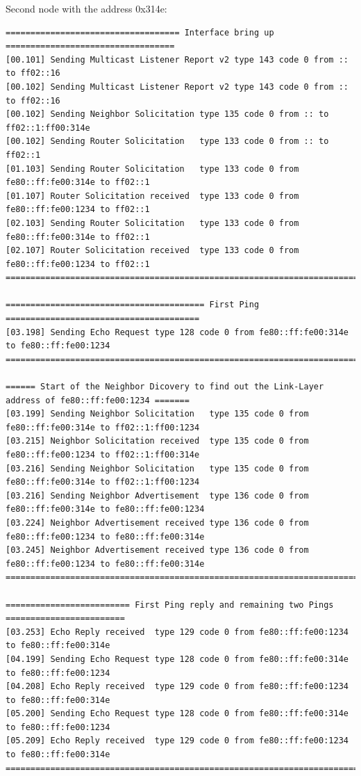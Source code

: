 Second node with the address 0x314e:
\begin{lstlisting}[numbers=none, basicstyle=\tiny]
=================================== Interface bring up ==================================
[00.101] Sending Multicast Listener Report v2 type 143 code 0 from :: to ff02::16
[00.102] Sending Multicast Listener Report v2 type 143 code 0 from :: to ff02::16
[00.102] Sending Neighbor Solicitation type 135 code 0 from :: to ff02::1:ff00:314e
[00.102] Sending Router Solicitation   type 133 code 0 from :: to ff02::1
[01.103] Sending Router Solicitation   type 133 code 0 from fe80::ff:fe00:314e to ff02::1
[01.107] Router Solicitation received  type 133 code 0 from fe80::ff:fe00:1234 to ff02::1
[02.103] Sending Router Solicitation   type 133 code 0 from fe80::ff:fe00:314e to ff02::1
[02.107] Router Solicitation received  type 133 code 0 from fe80::ff:fe00:1234 to ff02::1
=========================================================================================

======================================== First Ping =======================================
[03.198] Sending Echo Request type 128 code 0 from fe80::ff:fe00:314e to fe80::ff:fe00:1234
===========================================================================================

====== Start of the Neighbor Dicovery to find out the Link-Layer address of fe80::ff:fe00:1234 =======
[03.199] Sending Neighbor Solicitation   type 135 code 0 from fe80::ff:fe00:314e to ff02::1:ff00:1234
[03.215] Neighbor Solicitation received  type 135 code 0 from fe80::ff:fe00:1234 to ff02::1:ff00:314e
[03.216] Sending Neighbor Solicitation   type 135 code 0 from fe80::ff:fe00:314e to ff02::1:ff00:1234
[03.216] Sending Neighbor Advertisement  type 136 code 0 from fe80::ff:fe00:314e to fe80::ff:fe00:1234
[03.224] Neighbor Advertisement received type 136 code 0 from fe80::ff:fe00:1234 to fe80::ff:fe00:314e
[03.245] Neighbor Advertisement received type 136 code 0 from fe80::ff:fe00:1234 to fe80::ff:fe00:314e
======================================================================================================

========================= First Ping reply and remaining two Pings ========================
[03.253] Echo Reply received  type 129 code 0 from fe80::ff:fe00:1234 to fe80::ff:fe00:314e
[04.199] Sending Echo Request type 128 code 0 from fe80::ff:fe00:314e to fe80::ff:fe00:1234
[04.208] Echo Reply received  type 129 code 0 from fe80::ff:fe00:1234 to fe80::ff:fe00:314e
[05.200] Sending Echo Request type 128 code 0 from fe80::ff:fe00:314e to fe80::ff:fe00:1234
[05.209] Echo Reply received  type 129 code 0 from fe80::ff:fe00:1234 to fe80::ff:fe00:314e
===========================================================================================
\end{lstlisting}

